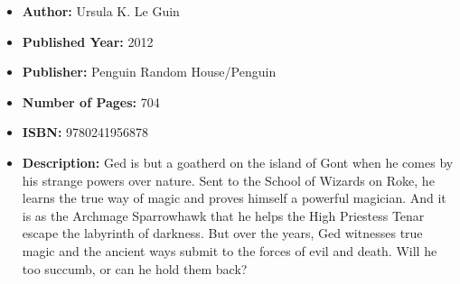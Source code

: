 \documentclass{tufte-handout}
\begin{document}
\begin{itemize}
    \item[] \textbf{Author:} Ursula K. Le Guin
    \item[] \textbf{Published Year:} 2012
    \item[] \textbf{Publisher:} Penguin Random House/Penguin
    \item[] \textbf{Number of Pages:} 704      
    \item[] \textbf{ISBN:} 9780241956878
    \item[] \textbf{Description:} Ged is but a goatherd on the island of Gont when he comes by his strange powers over nature. Sent to the School of Wizards on Roke, he learns the true way of magic and proves himself a powerful magician. And it is as the Archmage Sparrowhawk that he helps the High Priestess Tenar escape the labyrinth of darkness. But over the years, Ged witnesses true magic and the ancient ways submit to the forces of evil and death. Will he too succumb, or can he hold them back?
\end{itemize}
\end{document}
